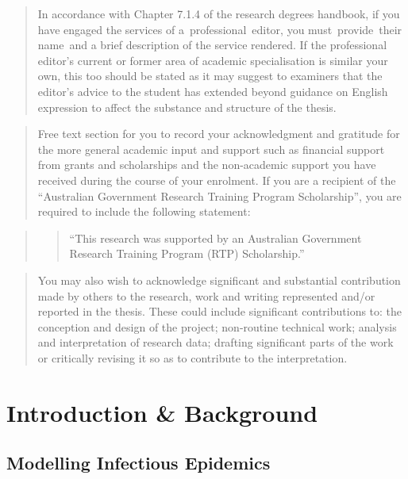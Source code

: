 \documentclass[
  letterpaper,
  DIV=11,
  numbers=noendperiod]{scrreprt}
\begin{document}
\begin{quote}
In accordance with Chapter 7.1.4 of the research degrees handbook, if
you have engaged the services of a~professional~editor, you
must~provide~their name~and a brief description of the service rendered.
If the professional editor's current or former area of academic
specialisation is similar your own, this too should be stated as it may
suggest to examiners that the editor's advice to the student has
extended beyond guidance on English expression to affect the substance
and structure of the thesis.
\end{quote}

\begin{quote}
Free text section for you to record your acknowledgment and gratitude
for the more general academic input and support such as financial
support from grants and scholarships and the non-academic support you
have received during the course of your enrolment. If you are a
recipient of the ``Australian Government Research Training Program
Scholarship'', you are required to include the following statement:
\end{quote}

\begin{quote}
\begin{quote}
``This research was supported by an Australian Government Research
Training Program (RTP) Scholarship.''
\end{quote}
\end{quote}

\begin{quote}
You may also wish to acknowledge significant and substantial
contribution made by others to the research, work and writing
represented and/or reported in the thesis. These could include
significant contributions to: the conception and design of the project;
non-routine technical work; analysis and interpretation of research
data; drafting significant parts of the work or critically revising it
so as to contribute to the interpretation.
\end{quote}

\clearpage{}\setcounter{page}{0}


\hypertarget{sec-intro}{%
\chapter{Introduction \& Background}\label{sec-intro}}

\hypertarget{modelling-infectious-epidemics}{%
\section{Modelling Infectious
Epidemics}\label{modelling-infectious-epidemics}}
\end{document}
